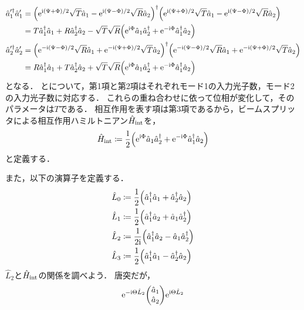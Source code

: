 \documentclass{report}
\begin{document}
    \begin{align}
      \hat{a}_1'^{\dag}\hat{a}_1' &= \qty(\mathrm{e}^{\mathrm{i}(\Psi + \Phi) / 2}\sqrt{T}\hat{a}_1 - \mathrm{e}^{\mathrm{i}(\Psi - \Phi) / 2}\sqrt{R}\hat{a}_2)^{\dag}\qty(\mathrm{e}^{\mathrm{i}(\Psi + \Phi) / 2}\sqrt{T}\hat{a}_1 - \mathrm{e}^{\mathrm{i}(\Psi - \Phi) / 2}\sqrt{R}\hat{a}_2) \\ 
      &= T\hat{a}_1^{\dag}\hat{a}_1 + R \hat{a}_2^{\dag}\hat{a}_2 - \sqrt{T}\sqrt{R}\qty(\mathrm{e}^{\mathrm{i}\Phi}\hat{a}_1\hat{a}_2^{\dag} + \mathrm{e}^{-\mathrm{i}\Phi}\hat{a}_1^{\dag}\hat{a}_2)\label{power-a1} \\ 
      \hat{a}_2'^{\dag}\hat{a}_2' &= \qty(\mathrm{e}^{-\mathrm{i}(\Psi - \Phi) / 2}\sqrt{R}\hat{a}_1 + \mathrm{e}^{-\mathrm{i}(\Psi + \Phi) / 2}\sqrt{T}\hat{a}_2)^{\dag}\qty(\mathrm{e}^{-\mathrm{i}(\Psi - \Phi) / 2}\sqrt{R}\hat{a}_1 + \mathrm{e}^{-\mathrm{i}(\Psi + \Phi) / 2}\sqrt{T}\hat{a}_2) \\ 
      &= R\hat{a}_1^{\dag}\hat{a}_1 + T\hat{a}_2^{\dag}\hat{a}_2 + \sqrt{T}\sqrt{R}\qty(\mathrm{e}^{\mathrm{i}\Phi}\hat{a}_1\hat{a}_2^{\dag} + \mathrm{e}^{-\mathrm{i}\Phi}\hat{a}_1^{\dag}\hat{a}_2)\label{power-a2}
    \end{align}
    となる．
    とについて，第1項と第2項はそれぞれモード1の入力光子数，モード2の入力光子数に対応する．
    これらの重ね合わせに依って位相が変化して，そのパラメータは$T$である．
    相互作用を表す項は第3項であるから，ビームスプリッタによる相互作用ハミルトニアン$\hat{H}_{\mathrm{int}}$を，
    \begin{align}
      \hat{H}_{\mathrm{int}} \coloneqq \frac{1}{2}\qty(\mathrm{e}^{\mathrm{i}\Phi}\hat{a}_1\hat{a}_2^{\dag} + \mathrm{e}^{-\mathrm{i}\Phi}\hat{a}_1^{\dag}\hat{a}_2)
    \end{align}
    と定義する．
    \par
    また，以下の演算子を定義する．
    \begin{align}
      \hat{L}_0 &\coloneqq \frac{1}{2}\qty(\hat{a}_1^{\dag}\hat{a}_1 + \hat{a}_2^{\dag}\hat{a}_2) \\ 
      \hat{L}_1 &\coloneqq \frac{1}{2}\qty(\hat{a}_1^{\dag}\hat{a}_2 + \hat{a}_1\hat{a}_2^{\dag}) \\ 
      \hat{L}_2 &\coloneqq \frac{1}{2\mathrm{i}}\qty(\hat{a}_1^{\dag}\hat{a}_2 - \hat{a}_1\hat{a}_2^{\dag}) \\ 
      \hat{L}_3 &\coloneqq \frac{1}{2}\qty(\hat{a}_1^{\dag}\hat{a}_1 - \hat{a}_2^{\dag}\hat{a}_2) 
    \end{align}
    $\hat{L}_2$と$\hat{H}_{\mathrm{int}}$の関係を調べよう．
    唐突だが，
    \begin{align}
      \e^{-\i\Theta\hat{L}_2}\mqty(\hat{a}_1 \\ \hat{a}_2)\e^{\i\Theta\hat{L}_2} \label{ml2a1a2ml2}
    \end{align}
\end{document}
